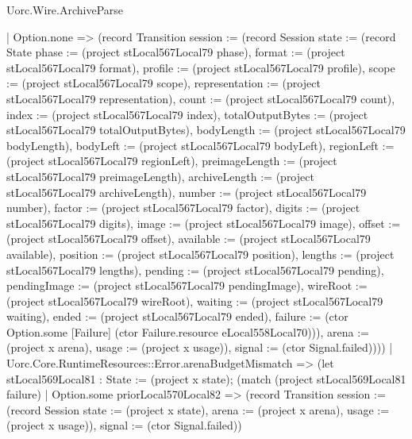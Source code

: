 \begin{lexlean}{Uorc.Wire.ArchiveParse}
\begin{semanticmodule}
{        | Option.none => (record Transition {session := (record Session {state := (record State {phase := (project stLocal567Local79 phase), format := (project stLocal567Local79 format), profile := (project stLocal567Local79 profile), scope := (project stLocal567Local79 scope), representation := (project stLocal567Local79 representation), count := (project stLocal567Local79 count), index := (project stLocal567Local79 index), totalOutputBytes := (project stLocal567Local79 totalOutputBytes), bodyLength := (project stLocal567Local79 bodyLength), bodyLeft := (project stLocal567Local79 bodyLeft), regionLeft := (project stLocal567Local79 regionLeft), preimageLength := (project stLocal567Local79 preimageLength), archiveLength := (project stLocal567Local79 archiveLength), number := (project stLocal567Local79 number), factor := (project stLocal567Local79 factor), digits := (project stLocal567Local79 digits), image := (project stLocal567Local79 image), offset := (project stLocal567Local79 offset), available := (project stLocal567Local79 available), position := (project stLocal567Local79 position), lengths := (project stLocal567Local79 lengths), pending := (project stLocal567Local79 pending), pendingImage := (project stLocal567Local79 pendingImage), wireRoot := (project stLocal567Local79 wireRoot), waiting := (project stLocal567Local79 waiting), ended := (project stLocal567Local79 ended), failure := (ctor Option.some [Failure] (ctor Failure.resource eLocal558Local70))}), arena := (project x arena), usage := (project x usage)}), signal := (ctor Signal.failed)})))
      | Uorc.Core.RuntimeResources::Error.arenaBudgetMismatch => (let stLocal569Local81 : State := (project x state); (match (project stLocal569Local81 failure)
        | Option.some priorLocal570Local82 => (record Transition {session := (record Session {state := (project x state), arena := (project x arena), usage := (project x usage)}), signal := (ctor Signal.failed)})
}
\end{semanticmodule}
\end{lexlean}
